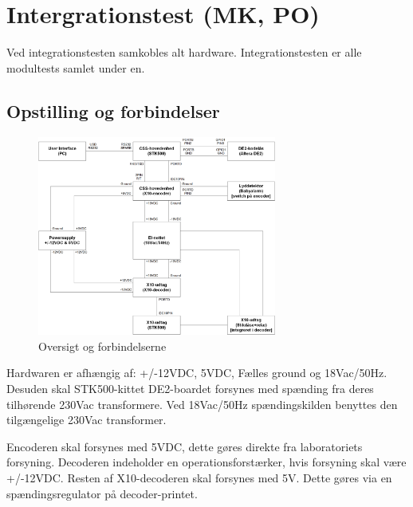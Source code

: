 \chapter{Intergrationstest (MK, PO)}
Ved integrationstesten samkobles alt hardware. Integrationstesten er alle modultests samlet under en. 

\section{Opstilling og forbindelser}

\begin{figure}[H]
	\centering
	\includegraphics[width=0.7\textwidth]{billeder/IntTest/Integration_oversigt}
	\caption{Oversigt og forbindelserne}
	\label{fig:integration_oversigt}
\end{figure}

Hardwaren er afhængig af: +/-12VDC, 5VDC, Fælles ground og 18Vac/50Hz. Desuden skal STK500-kittet DE2-boardet forsynes med spænding fra deres tilhørende 230Vac transformere. Ved 18Vac/50Hz spændingskilden benyttes den tilgængelige 230Vac transformer. 

Encoderen skal forsynes med 5VDC, dette gøres direkte fra laboratoriets forsyning.
Decoderen indeholder en operationsforstærker, hvis forsyning skal være +/-12VDC. Resten af X10-decoderen skal forsynes med 5V. Dette gøres via en spændingsregulator på decoder-printet.   

